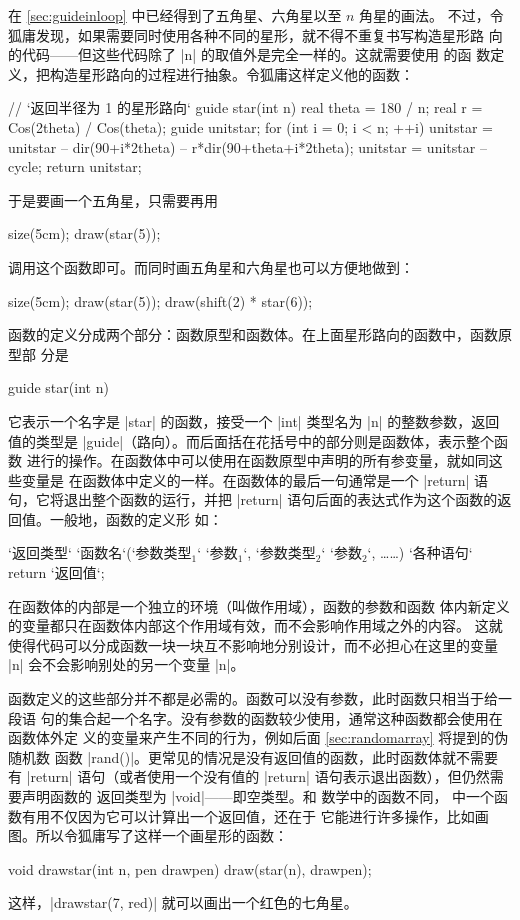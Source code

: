 在 \autoref{sec:guideinloop} 中已经得到了五角星、六角星以至 $n$ 角星的画法。
不过，令狐庸发现，如果需要同时使用各种不同的星形，就不得不重复书写构造星形路
向的代码——但这些代码除了 |n| 的取值外是完全一样的。这就需要使用 \Asy{} 的函
数定义，把构造星形路向的过程进行抽象。令狐庸这样定义他的函数：
\begin{asycode}
// `\color{comment}返回半径为 1 的星形路向`
guide star(int n)
{
    real theta = 180 / n;
    real r = Cos(2theta) / Cos(theta);
    guide unitstar;
    for (int i = 0; i < n; ++i)
        unitstar = unitstar -- dir(90+i*2theta) -- r*dir(90+theta+i*2theta);
    unitstar = unitstar -- cycle;
    return unitstar;
}
\end{asycode}
于是要画一个五角星，只需要再用
\begin{asycode}
size(5cm);
draw(star(5));
\end{asycode}
调用这个函数即可。而同时画五角星和六角星也可以方便地做到：
\begin{asycode}
size(5cm);
draw(star(5));
draw(shift(2) * star(6));
\end{asycode}

函数的定义分成两个部分：函数原型和函数体。在上面星形路向的函数中，函数原型部
分是
\begin{asycode}
guide star(int n)
\end{asycode}
它表示一个名字是 |star| 的函数，接受一个 |int| 类型名为 |n| 的整数参数，返回
值的类型是 |guide|（路向）。而后面括在花括号中的部分则是函数体，表示整个函数
进行的操作。在函数体中可以使用在函数原型中声明的所有参变量，就如同这些变量是
在函数体中定义的一样。在函数体的最后一句通常是一个 |return|
 语句，它将退出整个函数的运行，并把 |return|
语句后面的表达式作为这个函数的返回值。一般地，函数的定义形
如：
\begin{asycode}
`返回类型` `函数名`(`参数类型$_1$` `参数$_1$`, `参数类型$_2$` `参数$_2$`, ……)
{
    `各种语句`
    return `返回值`;
}
\end{asycode}
在函数体的内部是一个独立的环境（叫做作用域），函数的参数和函数
体内新定义的变量都只在函数体内部这个作用域有效，而不会影响作用域之外的内容。
这就使得代码可以分成函数一块一块互不影响地分别设计，而不必担心在这里的变量
|n| 会不会影响别处的另一个变量 |n|。

函数定义的这些部分并不都是必需的。函数可以没有参数，此时函数只相当于给一段语
句的集合起一个名字。没有参数的函数较少使用，通常这种函数都会使用在函数体外定
义的变量来产生不同的行为，例如后面 \autoref{sec:randomarray} 将提到的伪随机数
函数 |rand()|。更常见的情况是没有返回值的函数，此时函数体就不需要有 |return|
语句（或者使用一个没有值的 |return| 语句表示退出函数），但仍然需要声明函数的
返回类型为 |void|——即空类型。和
数学中的函数不同，\Asy{} 中一个函数有用不仅因为它可以计算出一个返回值，还在于
它能进行许多操作，比如画图。所以令狐庸写了这样一个画星形的函数：
\begin{asycode}
void drawstar(int n, pen drawpen)
{
    draw(star(n), drawpen);
}
\end{asycode}
这样，|drawstar(7, red)| 就可以画出一个红色的七角星。

